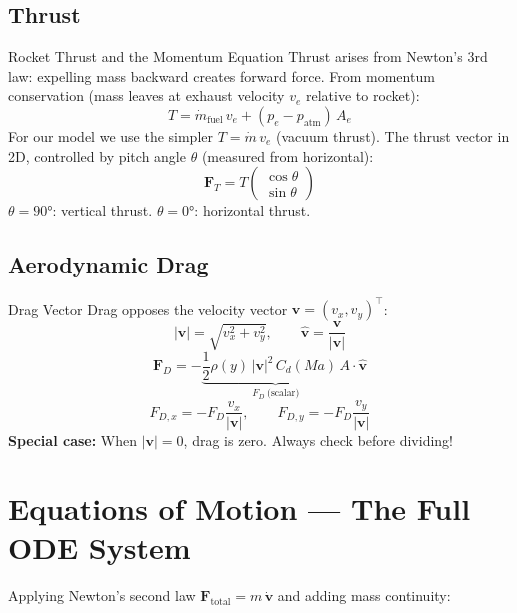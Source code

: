 \documentclass[12pt, a4paper]{article}
\begin{document}
\subsection*{Thrust}

\begin{theorybox}{Rocket Thrust and the Momentum Equation}
Thrust arises from Newton's 3rd law: expelling mass backward creates forward force.
From momentum conservation (mass leaves at exhaust velocity $v_e$ relative to rocket):
\[
  T = \dot{m}_\text{fuel}\,v_e + (p_e - p_\text{atm})\,A_e
\]
For our model we use the simpler $T = \dot{m}\,v_e$ (vacuum thrust).
The thrust vector in 2D, controlled by pitch angle $\theta$ (measured from horizontal):
\[
  \mathbf{F}_T = T\begin{pmatrix}\cos\theta \\ \sin\theta\end{pmatrix}
\]
$\theta = 90°$: vertical thrust. $\theta = 0°$: horizontal thrust.
\end{theorybox}

\subsection*{Aerodynamic Drag}

\begin{theorybox}{Drag Vector}
Drag opposes the velocity vector $\mathbf{v} = (v_x, v_y)^\top$:
\[
  |\mathbf{v}| = \sqrt{v_x^2 + v_y^2}, \qquad \hat{\mathbf{v}} = \frac{\mathbf{v}}{|\mathbf{v}|}
\]
\[
  \mathbf{F}_D = -\underbrace{\frac{1}{2}\rho(y)\,|\mathbf{v}|^2\,C_d(Ma)\,A}_{F_D\ \text{(scalar)}}\cdot\hat{\mathbf{v}}
\]
\[
  F_{D,x} = -F_D\frac{v_x}{|\mathbf{v}|}, \qquad F_{D,y} = -F_D\frac{v_y}{|\mathbf{v}|}
\]
\textbf{Special case:} When $|\mathbf{v}| = 0$, drag is zero. Always check before dividing!
\end{theorybox}

\section{Equations of Motion — The Full ODE System}

Applying Newton's second law $\mathbf{F}_\text{total} = m\,\dot{\mathbf{v}}$ and adding mass continuity:
\end{document}
